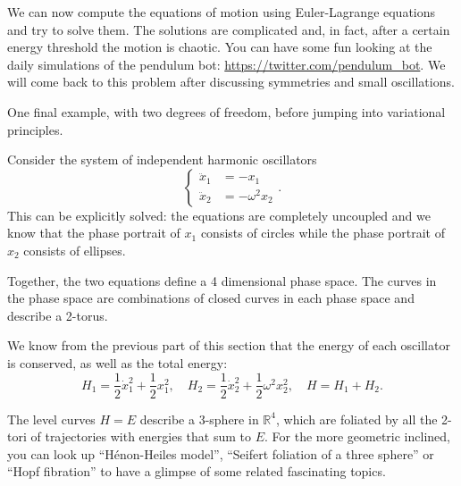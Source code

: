 \documentclass[english,fontsize=11pt,paper=a5,oneside]{scrbook}
\theoremstyle{definition}
\newenvironment{example}
  {\pushQED{\qed}\renewcommand{\qedsymbol}{$\lozenge$}\examplex}
  {\popQED\endexamplex}
\begin{document}
\begin{example}[Double pendulum]
    We can now compute the equations of motion using Euler-Lagrange equations and try to solve them.
    The solutions are complicated and, in fact, after a certain energy threshold the motion is chaotic.
    You can have some fun looking at the daily simulations of the pendulum bot: \url{https://twitter.com/pendulum_bot}. 
    We will come back to this problem after discussing symmetries and small oscillations.
\end{example}

One final example, with two degrees of freedom, before jumping into variational principles.

\begin{example}[Lissajous Figures]\label{exa:lissajous}
Consider the system of independent harmonic oscillators
\begin{equation}
    \left\lbrace
    \begin{aligned}
        \ddot x_1 &= -x_1\\
        \ddot x_2 &= -\omega^2 x_2
    \end{aligned}
    \right..
\end{equation}
This can be explicitly solved: the equations are completely uncoupled and we know that the phase portrait of $x_1$ consists of circles while the phase portrait of $x_2$ consists of ellipses.

Together, the two equations define a 4 dimensional phase space. The curves in the phase space are combinations of closed curves in each phase space and describe a 2-torus.

We know from the previous part of this section that the energy of each oscillator is conserved, as well as the total energy:
\begin{equation}
    H_1 = \frac12\dot x_1^2 + \frac12 x_1^2, \quad
    H_2 = \frac12\dot x_2^2 + \frac12 \omega^2 x_2^2, \quad
    H = H_1 + H_2.
\end{equation}

The level curves $H=E$ describe a 3-sphere in $\mathbb{R}^4$, which are foliated by all the 2-tori of trajectories with energies that sum to $E$. For the more geometric inclined, you can look up ``H\'enon-Heiles model'', ``Seifert foliation of a three sphere'' or ``Hopf fibration'' to have a glimpse of some related fascinating topics.


\end{example}
\end{document}

